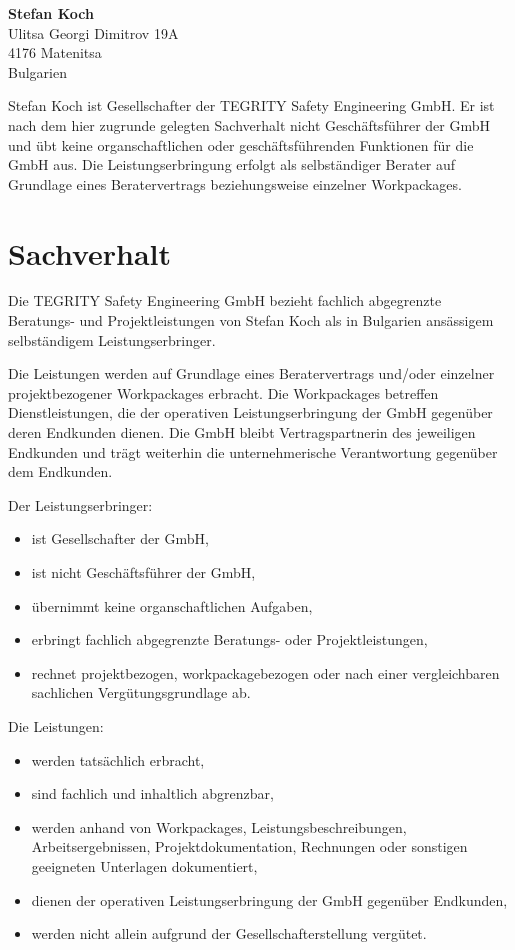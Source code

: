 \documentclass[11pt,a4paper]{article}
\begin{document}
\textbf{Stefan Koch}\\
Ulitsa Georgi Dimitrov 19A\\
4176 Matenitsa\\
Bulgarien

\vspace{0.5em}

Stefan Koch ist Gesellschafter der TEGRITY Safety Engineering GmbH. Er ist nach dem hier zugrunde gelegten Sachverhalt nicht Geschäftsführer der GmbH und übt keine organschaftlichen oder geschäftsführenden Funktionen für die GmbH aus. Die Leistungserbringung erfolgt als selbständiger Berater auf Grundlage eines Beratervertrags beziehungsweise einzelner Workpackages.

\section{Sachverhalt}

Die TEGRITY Safety Engineering GmbH bezieht fachlich abgegrenzte Beratungs- und Projektleistungen von Stefan Koch als in Bulgarien ansässigem selbständigem Leistungserbringer.

Die Leistungen werden auf Grundlage eines Beratervertrags und/oder einzelner projektbezogener Workpackages erbracht. Die Workpackages betreffen Dienstleistungen, die der operativen Leistungserbringung der GmbH gegenüber deren Endkunden dienen. Die GmbH bleibt Vertragspartnerin des jeweiligen Endkunden und trägt weiterhin die unternehmerische Verantwortung gegenüber dem Endkunden.

Der Leistungserbringer:

\begin{itemize}
    \item ist Gesellschafter der GmbH,
    \item ist nicht Geschäftsführer der GmbH,
    \item übernimmt keine organschaftlichen Aufgaben,
    \item erbringt fachlich abgegrenzte Beratungs- oder Projektleistungen,
    \item rechnet projektbezogen, workpackagebezogen oder nach einer vergleichbaren sachlichen Vergütungsgrundlage ab.
\end{itemize}

Die Leistungen:

\begin{itemize}
    \item werden tatsächlich erbracht,
    \item sind fachlich und inhaltlich abgrenzbar,
    \item werden anhand von Workpackages, Leistungsbeschreibungen, Arbeitsergebnissen, Projektdokumentation, Rechnungen oder sonstigen geeigneten Unterlagen dokumentiert,
    \item dienen der operativen Leistungserbringung der GmbH gegenüber Endkunden,
    \item werden nicht allein aufgrund der Gesellschafterstellung vergütet.
\end{itemize}
\end{document}
